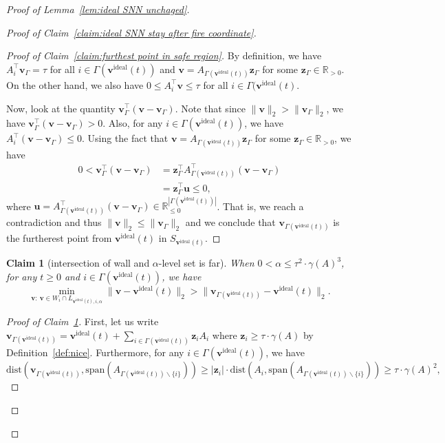 \documentclass[11pt]{article}
\newtheorem{claim}{Claim}[lemma]
\theoremstyle{remark}
\theoremstyle{definition}
\newcommand{\bz}{\mathbf{z}}
\newcommand{\bv}{\mathbf{v}}
\newcommand{\bu}{\mathbf{u}}
\newcommand{\R}{{\mathbb R}} %
\begin{document}
\begin{proof}[Proof of Lemma~\ref{lem:ideal SNN unchaged}]
\begin{proof}[Proof of Claim~\ref{claim:ideal SNN stay after fire coordinate}]
\begin{proof}[Proof of Claim~\ref{claim:furthest point in safe region}]
			By definition, we have $A_i^\top\bv_\Gamma=\tau$ for all $i\in\Gamma(\bv^\text{ideal}(t))$ and $\bv=A_{\Gamma(\bv^\text{ideal}(t))}\bz_\Gamma$ for some $\bz_\Gamma\in\R_{>0}$. On the other hand, we also have $0\leq A_i^\top\bv\leq\tau$ for all $i\in\Gamma(\bv^\text{ideal}(t)$.
			
			Now, look at the quantity $\bv_{\Gamma}^\top\left(\bv-\bv_\Gamma\right)$. Note that since $\|\bv\|_2>\|\bv_\Gamma\|_2$, we have $\bv_{\Gamma}^\top\left(\bv-\bv_\Gamma\right)>0$. Also, for any $i\in\Gamma(\bv^\text{ideal}(t))$, we have $A_i^\top\left(\bv-\bv_\Gamma\right)\leq0$. Using the fact that $\bv=A_{\Gamma(\bv^\text{ideal}(t))}\bz_\Gamma$ for some $\bz_\Gamma\in\R_{>0}$, we have
			\begin{align*}
			0 < \bv_{\Gamma}^\top\left(\bv-\bv_\Gamma\right)&=\bz_\Gamma^\top A_{\Gamma(\bv^\text{ideal}(t))}^\top\left(\bv-\bv_\Gamma\right)\\
			&= \bz_\Gamma^\top\bu\leq0,
			\end{align*}
			where $\bu=A_{\Gamma(\bv^\text{ideal}(t))}^\top\left(\bv-\bv_\Gamma\right)\in\R_{\leq0}^{|\Gamma(\bv^\text{ideal}(t))|}$. That is, we reach a contradiction and thus $\|\bv\|_2\leq\|\bv_\Gamma\|_2$ and we conclude that $\bv_{\Gamma(\bv^\text{ideal}(t))}$ is the furtherest point from $\bv^\text{ideal}(t)$ in $S_{\bv^\text{ideal}(t)}$.
		\end{proof}
		\begin{claim}[intersection of wall and $\alpha$-level set is far]\label{claim:ideal SNN intersection is far}
			When $0<\alpha\leq\tau^2\cdot\gamma(A)^3$, for any $t\geq0$ and $i\in\Gamma(\bv^\text{ideal}(t))$, we have
			$$
			\min_{\bv:\ \bv\in W_i\cap L_{\bv^\text{ideal}(t),i,\alpha}}\|\bv-\bv^\text{ideal}(t)\|_2>\|\bv_{\Gamma(\bv^\text{ideal}(t))}-\bv^\text{ideal}(t)\|_2.
			$$
		\end{claim}
		\begin{proof}[Proof of Claim~\ref{claim:ideal SNN intersection is far}]
			First, let us write $\bv_{\Gamma(\bv^\text{ideal}(t))}=\bv^\text{ideal}(t)+\sum_{i\in\Gamma(\bv^\text{ideal}(t))}\bz_iA_i$ where $\bz_i\geq\tau\cdot\gamma(A)$ by Definition~\ref{def:nice}. Furthermore, for any $i\in\Gamma(\bv^\text{ideal}(t))$, we have
			\begin{equation*}
			\text{dist}\left(\bv_{\Gamma(\bv^\text{ideal}(t))},\text{span}(A_{\Gamma(\bv^\text{ideal}(t))\backslash\{i\}})\right)\geq|\bz_i|\cdot\text{dist}\left(A_i,\text{span}(A_{\Gamma(\bv^\text{ideal}(t))\backslash\{i\}})\right)\geq\tau\cdot\gamma(A)^2,
			\end{equation*}

\end{proof}
\end{proof}
\end{proof}
\end{document}
